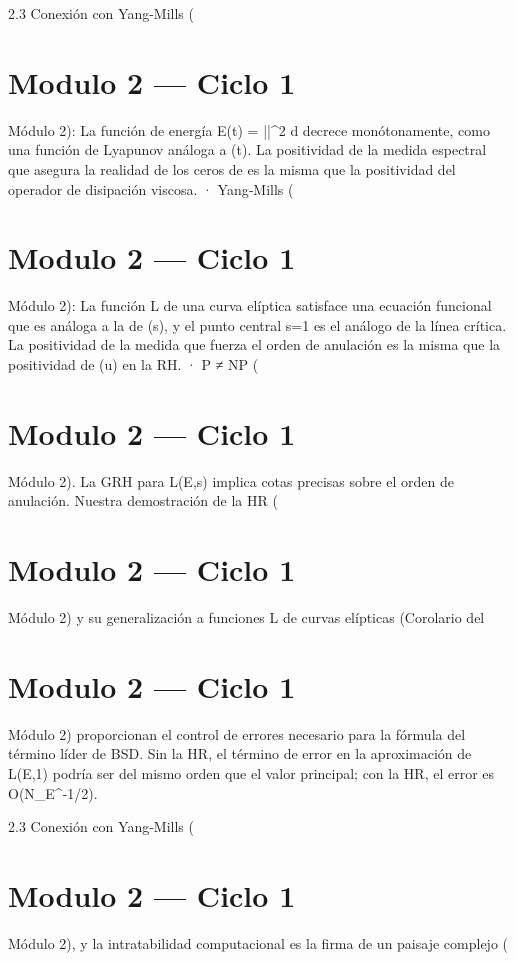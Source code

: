 \documentclass[12pt,twoside]{book}
\begin{document}
2.3 Conexión con Yang-Mills (

\chapter{Modulo 2 — Ciclo 1}
Módulo 2): La función de energía E(t) = \int ||^2 d decrece monótonamente, como una función de Lyapunov análoga a \Xi(t). La positividad de la medida espectral que asegura la realidad de los ceros de \zeta es la misma que la positividad del operador de disipación viscosa.
· Yang‑Mills (

\chapter{Modulo 2 — Ciclo 1}
Módulo 2): La función L de una curva elíptica satisface una ecuación funcional que es análoga a la de \zeta(s), y el punto central s=1 es el análogo de la línea crítica. La positividad de la medida que fuerza el orden de anulación es la misma que la positividad de \Phi(u) en la RH.
· P ≠ NP (

\chapter{Modulo 2 — Ciclo 1}
Módulo 2).
La GRH para L(E,s) implica cotas precisas sobre el orden de anulación. Nuestra demostración de la HR (

\chapter{Modulo 2 — Ciclo 1}
Módulo 2) y su generalización a funciones L de curvas elípticas (Corolario del 

\chapter{Modulo 2 — Ciclo 1}
Módulo 2) proporcionan el control de errores necesario para la fórmula del término líder de BSD. Sin la HR, el término de error en la aproximación de L(E,1) podría ser del mismo orden que el valor principal; con la HR, el error es O(N_E^{-1/2}).

2.3 Conexión con Yang-Mills (

\chapter{Modulo 2 — Ciclo 1}
Módulo 2), y la intratabilidad computacional es la firma de un paisaje complejo (
\end{document}
